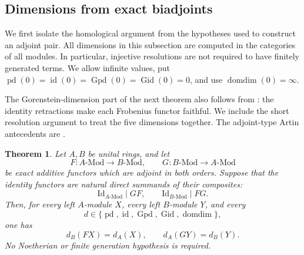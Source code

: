 \documentclass[12pt,a4paper,english,reqno]{amsart}
\numberwithin{equation}{section}
\theoremstyle{plain}
\newtheorem{theorem}{Theorem}[section]
\theoremstyle{definition}
\begin{document}
\subsection{Dimensions from exact biadjoints}
\label{subsec:adjoint-individual-dimensions}

We first isolate the homological argument from the hypotheses used
to construct an adjoint pair.  All dimensions in this subsection are
computed in the categories of all modules.  In particular, injective
resolutions are not required to have finitely generated terms.
We allow infinite values, put
$\operatorname{pd}(0)=\operatorname{id}(0)
=\operatorname{Gpd}(0)=\operatorname{Gid}(0)=0$, and use
$\operatorname{domdim}(0)=\infty$.

The Gorenstein-dimension part of the next theorem also follows from
\cite[Theorem~3.2 and Remark~3.3]{ChenRen2022}: the identity
retractions make each Frobenius functor faithful. We include the
short resolution argument to treat the five dimensions together.
The adjoint-type Artin antecedents are
\cite[Lemma~4.2 and Proposition~4.5]{bel-LiuXi2007}.

\begin{theorem}
\label{thm:adjoint-abstract-dimensions}
Let $A,B$ be unital rings, and let
\[
 F:A\text{-}\mathrm{Mod}\longrightarrow B\text{-}\mathrm{Mod},
 \qquad
 G:B\text{-}\mathrm{Mod}\longrightarrow A\text{-}\mathrm{Mod}
\]
be exact additive functors which are adjoint in both orders.  Suppose
that the identity functors are natural direct summands of their
composites:
\begin{equation}
 \mathrm{Id}_{A\text{-}\mathrm{Mod}}\mid GF,\qquad
 \mathrm{Id}_{B\text{-}\mathrm{Mod}}\mid FG.
 \label{eq:adjoint-identity-retracts}
\end{equation}
Then, for every left $A$-module $X$, every left $B$-module $Y$, and
every
\[
 d\in\{\operatorname{pd},\operatorname{id},
          \operatorname{Gpd},\operatorname{Gid},
          \operatorname{domdim}\},
\]
one has
\[
 d_B(FX)=d_A(X),\qquad d_A(GY)=d_B(Y).
\]
No Noetherian or finite generation hypothesis is required.
\end{theorem}
\end{document}
